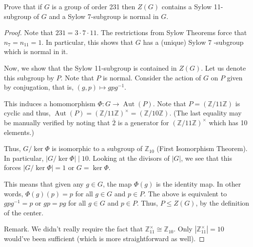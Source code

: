 \begin{exercise}
Prove that if $G$ is a group of order 231 then $Z(G)$ contains a Sylow 11-subgroup of $G$ and a Sylow 7-subgroup is normal in $G$.
\end{exercise}
\begin{proof}
Note that $231=3 \cdot 7 \cdot 11$. The restrictions from Sylow Theorems force that $n_7=n_{11}=1$. In particular, this shows that $G$ has a (unique) Sylow 7 -subgroup which is normal in it.

Now, we show that the Sylow 11-subgroup is contained in $Z(G)$. Let us denote this subgroup by $P$. Note that $P$ is normal. Consider the action of $G$ on $P$ given by conjugation, that is, $(g, p) \mapsto g p g^{-1}$.

This induces a homomorphism $\Phi: G \rightarrow \operatorname{Aut}(P)$. Note that $P=(\mathbb{Z} / 11 \mathbb{Z})$ is cyclic and thus, $\operatorname{Aut}(P)=(\mathbb{Z} / 11 \mathbb{Z})^{\times}=(\mathbb{Z} / 10 \mathbb{Z})$. (The last equality may be manually verified by noting that $\overline{2}$ is a generator for $(\mathbb{Z} / 11 \mathbb{Z})^{\times}$ which has 10 elements.)

Thus, $G / \operatorname{ker} \Phi$ is isomorphic to a subgroup of $\mathbb{Z}_{10}$ (First Isomorphism Theorem). In particular, $|G / \operatorname{ker} \Phi| \mid 10$. Looking at the divisors of $|G|$, we see that this forces $|G / \operatorname{ker} \Phi|=1$ or $G=\operatorname{ker} \Phi$.

This means that given any $g \in G$, the map $\Phi(g)$ is the identity map. In other words, $\Phi(g)(p)=p$ for all $g \in G$ and $p \in P$. The above is equivalent to $g p g^{-1}=p$ or $g p=p g$ for all $g \in G$ and $p \in P$. Thus, $P \leq Z(G)$, by the definition of the center.

Remark. We didn't really require the fact that $\mathbb{Z}_{11}^{\times} \cong \mathbb{Z}_{10}$. Only $\left|\mathbb{Z}_{11}^{\times}\right|=10$ would've been sufficient (which is more straightforward as well).
\end{proof}

